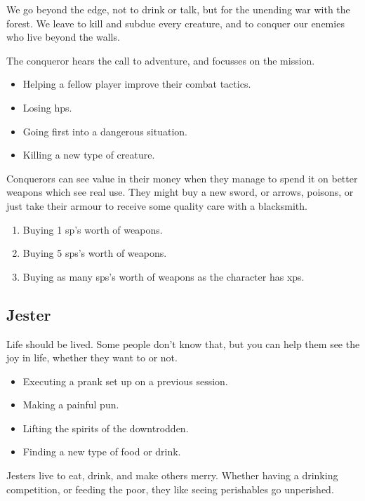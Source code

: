\begin{multicols}{2}
We go beyond the \gls{edge}, not to drink or talk, but for the unending war with the forest.
We leave to kill and subdue every creature, and to conquer our enemies who live beyond the walls.

The conqueror hears the call to adventure, and focusses on the mission.

\begin{itemize}

  \item
  Helping a fellow player improve their combat tactics.
  \item
  Losing \glspl{hp}.
  \item
  Going first into a dangerous situation.
  \item
  Killing a new type of creature.

\end{itemize}

Conquerors can see value in their money when they manage to spend it on better weapons which see real use.
They might buy a new sword, or arrows, poisons, or just take their armour to receive some quality care with a blacksmith.

\begin{enumerate}
  \item
  Buying 1 \gls{sp}'s worth of weapons.
  \item
  Buying 5 \glspl{sp}'s worth of weapons.
  \item
  Buying as many \glspl{sp}'s worth of weapons as the character has \glspl{xp}.
\end{enumerate}

\subsection{Jester}

Life should be lived.
Some people don't know that, but you can help them see the joy in life, whether they want to or not.

\begin{itemize}
  \item
  Executing a prank set up on a previous session.
  \item
  Making a painful pun.
  \item
  Lifting the spirits of the downtrodden.
  \item
  Finding a new type of food or drink.
\end{itemize}

Jesters live to eat, drink, and make others merry.
Whether having a drinking competition, or feeding the poor, they like seeing perishables go unperished.


\end{multicols}
